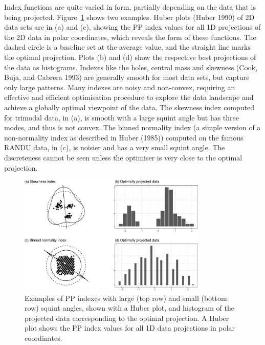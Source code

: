 \documentclass[
  12pt,
]{interact}
\theoremstyle{plain}
\begin{document}
Index functions are quite varied in form, partially depending on the
data that is being projected. Figure~\ref{fig-example-functions} shows
two examples. Huber plots (Huber 1990) of 2D data sets are in (a) and
(c), showing the PP index values for all 1D projections of the 2D data
in polar coordinates, which reveals the form of these functions. The
dashed circle is a baseline set at the average value, and the straight
line marks the optimal projection. Plots (b) and (d) show the respective
best projections of the data as histograms. Indexes like the holes,
central mass and skewness (Cook, Buja, and Cabrera 1993) are generally
smooth for most data sets, but capture only large patterns. Many indexes
are noisy and non-convex, requiring an effective and efficient
optimisation procedure to explore the data landscape and achieve a
globally optimal viewpoint of the data. The skewness index computed for
trimodal data, in (a), is smooth with a large squint angle but has three
modes, and thus is not convex. The binned normality index (a simple
version of a non-normality index as described in Huber (1985)) computed
on the famous RANDU data, in (c), is noisier and has a very small squint
angle. The discreteness cannot be seen unless the optimiser is very
close to the optimal projection.

\begin{figure}

{\centering \includegraphics[width=0.8\textwidth,height=\textheight]{jso_files/figure-pdf/fig-example-functions-1.pdf}

}

\caption{\label{fig-example-functions}Examples of PP indexes with large
(top row) and small (bottom row) squint angles, shown with a Huber plot,
and histogram of the projected data corresponding to the optimal
projection. A Huber plot shows the PP index values for all 1D data
projections in polar coordinates.}

\end{figure}
\end{document}
